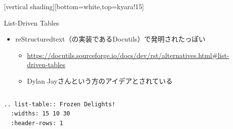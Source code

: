 \documentclass[14pt,dvipdfmx,uplatex]{beamer}
\begin{document}
[vertical shading][bottom=white,top=kyara!15]


\begin{frame}[t,fragile=singleslide]{\inhibitglue List-Driven Tables}
  \sffamily
  \begin{itemize}
    \item reStructuredtext（の実装であるDocutils）で発明されたっぽい
    \begin{itemize}
    \item \footnotesize
      \url{https://docutils.sourceforge.io/docs/dev/rst/alternatives.html\#list-driven-tables}
    \item Dylan Jayさんという方のアイデアとされている
    \end{itemize}
  \end{itemize}
  \begin{center}
    \begin{columns}[c]
      \begin{column}{.5\textwidth}
\fontsize{7.5pt}{7pt}\selectfont
\begin{tcolorbox}[left=1pt]
\begin{Verbatim}
.. list-table:: Frozen Delights!
  :widths: 15 10 30
  :header-rows: 1


\end{Verbatim}
\end{tcolorbox}
\end{column}
\end{columns}
\end{center}
\end{frame}
\end{document}
